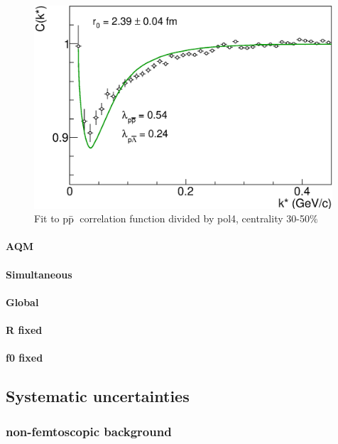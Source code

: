 \documentclass[ALICE,manyauthors]{ALICE_analysis_notes}
\newcommand{\pap}{$\rm p\bar{\rm p}$}
\begin{document}
\begin{figure}[]
   \centering
   \includegraphics[width=0.99\textwidth]{pics/divp4NumOutPckstarPAPtpcM4Psi3_fitpap2.eps}
   \caption{Fit to \pap~correlation function divided by pol4, centrality 30-50$\%$}
   \label{fig:fitpap2}
 \end{figure}

\paragraph{AQM}

\paragraph{Simultaneous}

\paragraph{Global}

\paragraph{R fixed}

\paragraph{f0 fixed}

\subsection{Systematic uncertainties}

\subsubsection{ non-femtoscopic background}
\end{document}
